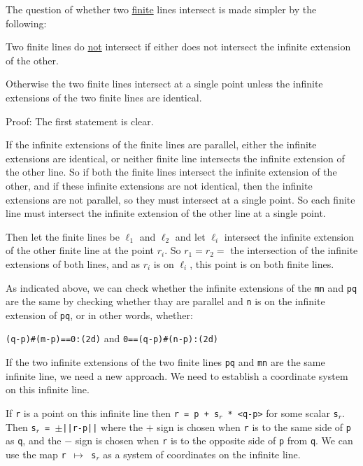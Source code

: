 \documentclass[12pt]{article}
\begin{document}
The question of whether two \underline{finite} lines intersect is made
simpler by the following:
\begin{lemma}
Two finite lines do \underline{not} intersect
if either does not intersect the infinite extension of the other.

Otherwise the two finite lines intersect at a single point unless
the infinite extensions of the two finite lines are identical.
\end{lemma}
\begin{indpar}{0.3in}
Proof: The first statement is clear.

If the infinite extensions of the finite lines are parallel, either
the infinite extensions are identical, or neither finite line
intersects the infinite extension of the other line.
So if both the finite lines intersect the infinite extension of the other,
and if these infinite extensions are not identical, then the
infinite extensions are not parallel, so they must intersect at a
single point.  So each finite line must intersect the infinite extension
of the other line at a single point.

Then let the finite lines be $\ell_1$ and $\ell_2$ and let
$\ell_i$ intersect the infinite extension of the other finite line
at the point $r_i$.  So $r_1=r_2=$ the intersection of the infinite
extensions of both lines, and as $r_i$ is on $\ell_i$, this point is
on both finite lines.
\end{indpar}

As indicated above,
we can check whether the infinite extensions of the {\tt mn} and {\tt pq}
are the same by checking whether thay are parallel and {\tt n} is on
the infinite extension of {\tt pq}, or in other words, whether: \\
\centerline{{\tt (q-p)\#(m-p)==0:(2d)} and {\tt 0==(q-p)\#(n-p):(2d)}}

If the two infinite extensions of the two finite lines {\tt pq} and
{\tt mn} are the same
infinite line, we need a new approach.  We need to establish a coordinate
system on this infinite line.

If {\tt r} is a point on this infinite line then
{\tt r = p + s$_r$ * <q-p>} for some scalar {\tt s$_r$}.  Then
{\tt s$_r$ = $\pm$||r-p||} where the $+$ sign is chosen when {\tt r}
is to the same side of {\tt p} as {\tt q}, and the $-$ sign is chosen
when {\tt r} is to the opposite side of {\tt p} from {\tt q}.
We can use the map {\tt r $\mapsto$ s$_r$} as a system of coordinates
on the infinite line.
\end{document}
